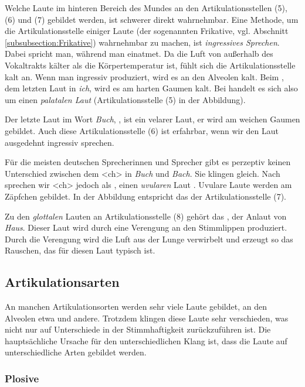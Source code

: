 Welche Laute im hinteren Bereich des Mundes an den Artikulationsstellen (5), (6) und (7) gebildet werden, ist schwerer direkt wahrnehmbar. Eine Methode, um die Artikulationsstelle einiger Laute (der sogenannten Frikative, vgl. Abschnitt \ref{subsubsection:Frikative}) wahrnehmbar zu machen, ist \textit{ingressives Sprechen}. Dabei spricht man, während man einatmet. Da die Luft von außerhalb des Vokaltrakts kälter als die Körpertemperatur ist, fühlt sich die Artikulationsstelle kalt an. Wenn man \textipa{[s]} ingressiv produziert, wird es an den Alveolen kalt. Beim \textipa{[\c{c}]}, dem letzten Laut in \textit{ich}, wird es am harten Gaumen kalt. Bei \textipa{[\c{c}]} handelt es sich also um einen \textit{palatalen Laut} (Artikulationsstelle (5) in der Abbildung). 

Der letzte Laut im Wort \textit{Buch}, \textipa{[x]}, ist ein velarer Laut, er wird am weichen Gaumen gebildet. Auch diese Artikulationsstelle (6) ist erfahrbar, wenn wir den Laut ausgedehnt ingressiv sprechen.

Für die meisten deutschen Sprecherinnen und Sprecher gibt es perzeptiv keinen Unterschied zwischen dem <ch> in \textit{Buch} und \textit{Bach}. Sie klingen gleich. Nach \textipa{[a]} sprechen wir <ch> jedoch als \textipa{[\textchi]}, einen \textit{uvularen} Laut . Uvulare Laute werden am Zäpfchen gebildet. In der Abbildung entspricht das der Artikulationsstelle (7).

Zu den \textit{glottalen} Lauten an Artikulationsstelle (8) gehört das \textipa{[h]}, der Anlaut von \textit{Haus}. Dieser Laut wird durch eine Verengung an den Stimmlippen produziert. Durch die Verengung wird die Luft aus der Lunge verwirbelt und erzeugt so das Rauschen, das für diesen Laut typisch ist. 

\subsection{Artikulationsarten}

An manchen Artikulationsorten werden sehr viele Laute gebildet, an den Alveolen etwa \textipa{[s, l, n, t]} und andere. Trotzdem klingen diese Laute sehr verschieden, was nicht nur auf Unterschiede in der Stimmhaftigkeit zurückzuführen ist. Die hauptsächliche Ursache für den unterschiedlichen Klang ist, dass die Laute auf unterschiedliche Arten gebildet werden.


\subsubsection{Plosive}
\label{subsection:Plosive}

